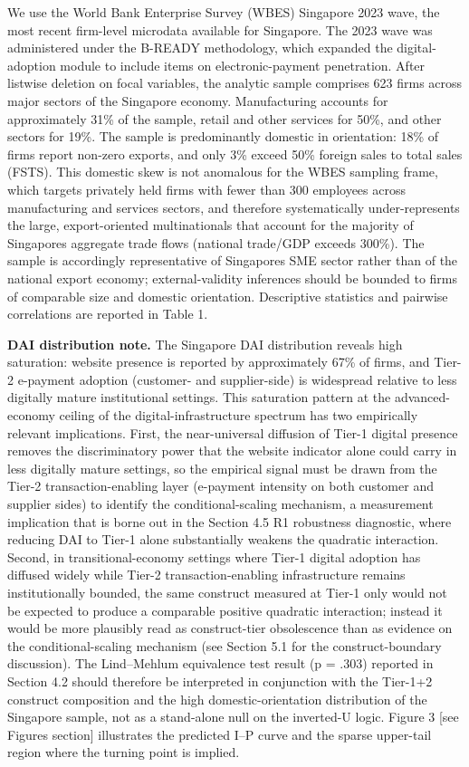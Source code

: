 \documentclass[12pt,a4paper]{article}
\begin{document}
We use the World Bank Enterprise Survey (WBES) Singapore 2023 wave, the
most recent firm-level microdata available for Singapore. The 2023 wave
was administered under the B-READY methodology, which expanded the
digital-adoption module to include items on electronic-payment
penetration. After listwise deletion on focal variables, the analytic
sample comprises 623 firms across major sectors of the Singapore
economy. Manufacturing accounts for approximately 31\% of the sample,
retail and other services for 50\%, and other sectors for 19\%. The
sample is predominantly domestic in orientation: 18\% of firms report
non-zero exports, and only 3\% exceed 50\% foreign sales to total sales
(FSTS). This domestic skew is not anomalous for the WBES sampling frame,
which targets privately held firms with fewer than 300 employees across
manufacturing and services sectors, and therefore systematically
under-represents the large, export-oriented multinationals that account
for the majority of Singapore\textquotesingle s aggregate trade flows
(national trade/GDP exceeds 300\%). The sample is accordingly
representative of Singapore\textquotesingle s SME sector rather than of
the national export economy; external-validity inferences should be
bounded to firms of comparable size and domestic orientation.
Descriptive statistics and pairwise correlations are reported in Table
1.

\textbf{DAI distribution note.} The Singapore DAI distribution reveals
high saturation: website presence is reported by approximately 67\% of
firms, and Tier-2 e-payment adoption (customer- and supplier-side) is
widespread relative to less digitally mature institutional settings.
This saturation pattern at the advanced-economy ceiling of the
digital-infrastructure spectrum has two empirically relevant
implications. First, the near-universal diffusion of Tier-1 digital
presence removes the discriminatory power that the website indicator
alone could carry in less digitally mature settings, so the empirical
signal must be drawn from the Tier-2 transaction-enabling layer
(e-payment intensity on both customer and supplier sides) to identify
the conditional-scaling mechanism, a measurement implication that is
borne out in the Section 4.5 R1 robustness diagnostic, where reducing
DAI to Tier-1 alone substantially weakens the quadratic interaction.
Second, in transitional-economy settings where Tier-1 digital adoption
has diffused widely while Tier-2 transaction-enabling infrastructure
remains institutionally bounded, the same construct measured at Tier-1
only would not be expected to produce a comparable positive quadratic
interaction; instead it would be more plausibly read as construct-tier
obsolescence than as evidence on the conditional-scaling mechanism (see
Section 5.1 for the construct-boundary discussion). The Lind--Mehlum
equivalence test result (p = .303) reported in Section 4.2 should
therefore be interpreted in conjunction with the Tier-1+2 construct
composition and the high domestic-orientation distribution of the
Singapore sample, not as a stand-alone null on the inverted-U logic.
Figure 3 {[}see Figures section{]} illustrates the predicted I--P curve
and the sparse upper-tail region where the turning point is implied.
\end{document}

